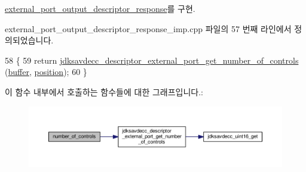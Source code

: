 \hyperlink{classavdecc__lib_1_1external__port__output__descriptor__response_a5accf7abc7d231a0767ad5cac68b8b39}{external\+\_\+port\+\_\+output\+\_\+descriptor\+\_\+response}를 구현.



external\+\_\+port\+\_\+output\+\_\+descriptor\+\_\+response\+\_\+imp.\+cpp 파일의 57 번째 라인에서 정의되었습니다.


\begin{DoxyCode}
58 \{
59     \textcolor{keywordflow}{return} \hyperlink{group__descriptor__external__port_ga154eb190781d99c3af23aabc9567dc1b}{jdksavdecc\_descriptor\_external\_port\_get\_number\_of\_controls}
      (\hyperlink{classavdecc__lib_1_1descriptor__response__base__imp_a56ed84df35de10bdb65e72b184309497}{buffer}, \hyperlink{classavdecc__lib_1_1descriptor__response__base__imp_a7a04afe5347934be732ec70a70bd0a28}{position});
60 \}
\end{DoxyCode}


이 함수 내부에서 호출하는 함수들에 대한 그래프입니다.\+:
\nopagebreak
\begin{figure}[H]
\begin{center}
\leavevmode
\includegraphics[width=350pt]{classavdecc__lib_1_1external__port__output__descriptor__response__imp_abdf54b1d2b03f5f2b7346ddc9d93df5c_cgraph}
\end{center}
\end{figure}


